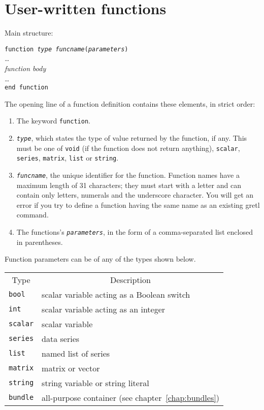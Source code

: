 \chapter{User-written functions}

Main structure:

\begin{flushleft}
\texttt{function \emph{type} \emph{funcname}(\emph{parameters})}\\
   \quad \ldots\\
   \quad \emph{function body}\\
   \quad \ldots \\
\texttt{end function}
\end{flushleft}

The opening line of a function definition contains these elements, in
strict order:

\begin{enumerate}
\item The keyword \texttt{function}.
\item \texttt{\emph{type}}, which states the type of value returned by the
  function, if any.  This must be one of \texttt{void} (if the
  function does not return anything), \texttt{scalar},
  \texttt{series}, \texttt{matrix}, \texttt{list} or \texttt{string}.
\item \texttt{\emph{funcname}}, the unique identifier for the function.
  Function names have a maximum length of 31 characters; they must
  start with a letter and can contain only letters, numerals and the
  underscore character.  You will get an error if you try to define a
  function having the same name as an existing gretl command.
\item The functions's \texttt{\emph{parameters}}, in the form of a
  comma-separated list enclosed in parentheses.
\end{enumerate}

Function parameters can be of any of the types shown below.

\begin{center}
\begin{tabular}{ll}
  \multicolumn{1}{c}{Type} & 
  \multicolumn{1}{c}{Description} \\ [4pt]
  \texttt{bool}   & scalar variable acting as a Boolean switch \\
  \texttt{int}    & scalar variable acting as an integer  \\
  \texttt{scalar} & scalar variable \\
  \texttt{series} & data series \\
  \texttt{list}   & named list of series \\
  \texttt{matrix} & matrix or vector \\
  \texttt{string} & string variable or string literal \\
  \texttt{bundle} & all-purpose container (see chapter~\ref{chap:bundles})
\end{tabular}
\end{center}

